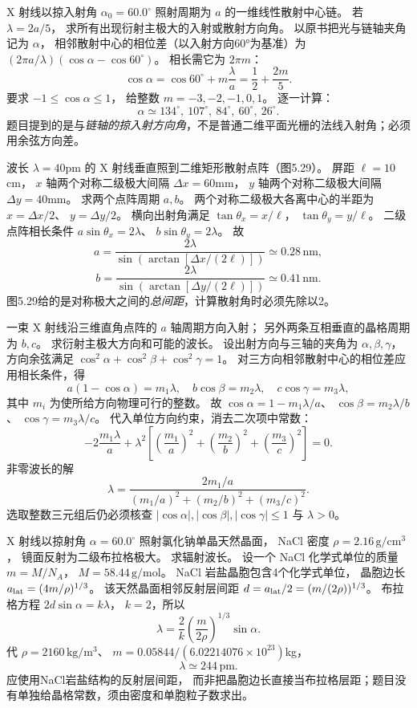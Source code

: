 X 射线以掠入射角
$\alpha_0=60.0^\circ$ 照射周期为 $a$ 的一维线性散射中心链。
若 $\lambda=2a/5$，
求所有出现衍射主极大的入射或散射方向角。
\exsolution
以原书把光与链轴夹角记为 $\alpha$，
相邻散射中心的相位差（以入射方向60°为基准）为
$(2\pi a/\lambda)(\cos\alpha-\cos60^\circ)$。
相长需它为 $2\pi m$：
\[
\boxed{\cos\alpha=\cos60^\circ+m\frac{\lambda}{a}
=\frac12+\frac{2m}{5}}.
\]
要求 $-1\le\cos\alpha\le1$，
给整数
$m=-3,-2,-1,0,1$。
逐一计算：
\[
\boxed{\alpha\simeq
134^\circ,\ 107^\circ,\ 84^\circ,\ 60^\circ,\ 26^\circ}.
\]
\excheck 题目提到的是与\emph{链轴的掠入射方向角}，不是普通二维平面光栅的法线入射角；必须用余弦方向差。

波长
$\lambda=40$pm 的 X 射线垂直照到二维矩形散射点阵（图5.29）。
屏距 $\ell=10$cm，
$x$ 轴两个对称二级极大间隔
$\Delta x=60$mm，
$y$ 轴两个对称二级极大间隔
$\Delta y=40$mm。
求两个点阵周期 $a,b$。
\exsolution
两个对称二级极大各离中心的半距为
$x=\Delta x/2$、
$y=\Delta y/2$。
横向出射角满足
$\tan\theta_x=x/\ell$，
$\tan\theta_y=y/\ell$。
二级点阵相长条件
$a\sin\theta_x=2\lambda$、
$b\sin\theta_y=2\lambda$。
故
\[
\boxed{a=\frac{2\lambda}
{\sin(\arctan[\Delta x/(2\ell)])}
\simeq0.28\,\mathrm{nm}},
\]
\[
\boxed{b=\frac{2\lambda}
{\sin(\arctan[\Delta y/(2\ell)])}
\simeq0.41\,\mathrm{nm}}.
\]
\excheck 图5.29给的是对称极大之间的\emph{总间距}，计算散射角时必须先除以2。

一束 X 射线沿三维直角点阵的 $a$ 轴周期方向入射；
另外两条互相垂直的晶格周期为 $b,c$。
求衍射主极大方向和可能的波长。
\exsolution
设出射方向与三轴的夹角为
$\alpha,\beta,\gamma$，
方向余弦满足
$\cos^2\alpha+\cos^2\beta+\cos^2\gamma=1$。
对三方向相邻散射中心的相位差应用相长条件，得
\[
\boxed{a(1-\cos\alpha)=m_1\lambda},\quad
\boxed{b\cos\beta=m_2\lambda},\quad
\boxed{c\cos\gamma=m_3\lambda},
\]
其中 $m_i$ 为使所给方向物理可行的整数。
故
$\cos\alpha=1-m_1\lambda/a$、
$\cos\beta=m_2\lambda/b$、
$\cos\gamma=m_3\lambda/c$。
代入单位方向约束，消去二次项中常数：
\[
-2\frac{m_1\lambda}{a}
+\lambda^2\left[
\left(\frac{m_1}{a}\right)^2+
\left(\frac{m_2}{b}\right)^2+
\left(\frac{m_3}{c}\right)^2
\right]=0.
\]
非零波长的解
\[
\boxed{\lambda=
\frac{2m_1/a}
{(m_1/a)^2+(m_2/b)^2+(m_3/c)^2}}.
\]
\excheck 选取整数三元组后仍必须核查
$|\cos\alpha|,|\cos\beta|,|\cos\gamma|\le1$ 与 $\lambda>0$。

X 射线以掠射角
$\alpha=60.0^\circ$ 照射氯化钠单晶天然晶面，
NaCl 密度
$\rho=2.16\,\mathrm{g/cm^3}$，
镜面反射为二级布拉格极大。
求辐射波长。
\exsolution
设一个 NaCl 化学式单位的质量
$m=M/N_A$，
$M=58.44\,\mathrm{g/mol}$。
NaCl 岩盐晶胞包含4个化学式单位，
晶胞边长
$a_{\rm lat}=(4m/\rho)^{1/3}$。
该天然晶面相邻反射层间距
$d=a_{\rm lat}/2=(m/(2\rho))^{1/3}$。
布拉格方程
$2d\sin\alpha=k\lambda$，
$k=2$，所以
\[
\boxed{\lambda=\frac{2}{k}
\left(\frac{m}{2\rho}\right)^{1/3}
\sin\alpha}.
\]
代
$\rho=2160\,\mathrm{kg/m^3}$、
$m=0.05844/(6.02214076\times10^{23})$kg，
\[
\boxed{\lambda\simeq244\,\mathrm{pm}}.
\]
\excheck 应使用NaCl岩盐结构的反射层间距，
而非把晶胞边长直接当布拉格层距；题目没有单独给晶格常数，须由密度和单胞粒子数求出。

